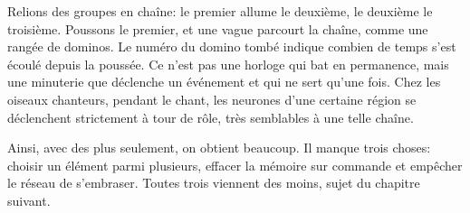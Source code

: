 Relions des groupes en chaîne: le premier allume le deuxième, le deuxième le troisième. Poussons le premier, et une vague parcourt la chaîne, comme une rangée de dominos. Le numéro du domino tombé indique combien de temps s'est écoulé depuis la poussée. Ce n'est pas une horloge qui bat en permanence, mais une minuterie que déclenche un événement et qui ne sert qu'une fois. Chez les oiseaux chanteurs, pendant le chant, les neurones d'une certaine région se déclenchent strictement à tour de rôle, très semblables à une telle chaîne.

Ainsi, avec des \og plus\fg{} seulement, on obtient beaucoup. Il manque trois choses: choisir un élément parmi plusieurs, effacer la mémoire sur commande et empêcher le réseau de s'embraser. Toutes trois viennent des \og moins\fg{}, sujet du chapitre suivant.

